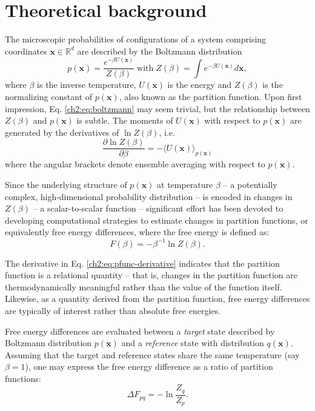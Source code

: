 \section{Theoretical background}

The microscopic probabilities of configurations of a system comprising coordinates $\mathbf{x}\in \mathbb{R}^d$ are described by the Boltzmann distribution
\begin{equation}
    \label{ch2:eq:boltzmann}
    p(\mathbf{x}) = \frac{e^{-\beta U(\mathbf{x})}}{Z(\beta)} \; \mathrm{with} \; Z(\beta) = \int e^{-\beta U(\mathbf{x})} d\mathbf{x},
\end{equation}
where $\beta$ is the inverse temperature, $U(\mathbf{x})$ is the energy and $Z(\beta)$ is the normalizing constant of $p(\mathbf{x})$, also known as the partition function. Upon first impression, Eq. \ref{ch2:eq:boltzmann} may seem trivial, but the relationship between $Z(\beta)$ and $p(\mathbf{x})$ is subtle. The moments of $U(\mathbf{x})$ with respect to $p(\mathbf{x})$ are generated by the derivatives of $\ln Z(\beta)$, i.e.
\begin{equation}
    \label{ch2:eq:pfunc-derivative}
    \frac{\partial \ln Z(\beta)}{\partial \beta} = -\langle U (\mathbf{x})\rangle_{p(\mathbf{x})}
\end{equation}
where the angular brackets denote ensemble averaging with respect to $p(\mathbf{x})$.

Since the underlying structure of $p(\mathbf{x})$ at temperature $\beta$ -- a potentially complex, high-dimensional probability distribution -- is encoded in changes in $Z(\beta)$ -- a scalar-to-scalar function -- significant effort has been devoted to developing computational strategies to estimate changes in partition functions, or equivalently free energy differences, where the free energy is defined as:
\begin{equation}
    F(\beta) = -\beta^{-1} \ln Z(\beta).
\end{equation}

The derivative in Eq. \ref{ch2:eq:pfunc-derivative} indicates that the partition function is a relational quantity -- that is, changes in the partition function are thermodynamically meaningful rather than the value of the function itself. Likewise, as a quantity derived from the partition function, free energy differences are typically of interest rather than absolute free energies.

Free energy differences are evaluated between a {\it target} state described by Boltzmann distribution $p(\mathbf{x})$ and a {\it reference} state with distribution $q(\mathbf{x})$. Assuming that the target and reference states share the same temperature (say $\beta=1$), one may express the free energy difference as a ratio of partition functions:
\begin{equation}
    \label{ch2:eq:fep-identity}
    \Delta F_{pq} = - \ln \frac{Z_q}{Z_p}.
\end{equation}

